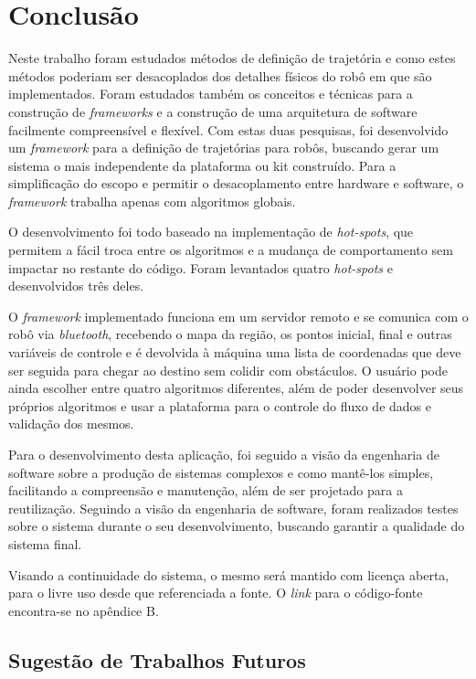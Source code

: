 \chapter[Conclusão]{Conclusão}

Neste trabalho foram estudados métodos de definição de trajetória e como estes métodos poderiam ser desacoplados dos detalhes físicos do robô em que são implementados. Foram estudados também os conceitos e técnicas para a construção de \textit{frameworks} e a construção de uma arquitetura de software facilmente compreensível e flexível. Com estas duas pesquisas, foi desenvolvido um \textit{framework} para a definição de trajetórias para robôs, buscando gerar um sistema o mais independente da plataforma ou kit construído. Para a simplificação do escopo e permitir o desacoplamento entre hardware e software, o \textit{framework} trabalha apenas com algoritmos globais.

O desenvolvimento foi todo baseado na implementação de \textit{hot-spots}, que permitem a fácil troca entre os algoritmos e a mudança de comportamento sem impactar no restante do código. Foram levantados quatro \textit{hot-spots} e desenvolvidos três deles.

O \textit{framework} implementado funciona em um servidor remoto e se comunica com o robô via \textit{bluetooth}, recebendo o mapa da região, os pontos inicial, final e outras variáveis de controle e é devolvida à máquina uma lista de coordenadas que deve ser seguida para chegar ao destino sem colidir com obstáculos. O usuário pode ainda escolher entre quatro algoritmos diferentes, além de poder desenvolver seus próprios algoritmos e usar a plataforma para o controle do fluxo de dados e validação dos mesmos.

Para o desenvolvimento desta aplicação, foi seguido a visão da engenharia de software sobre a produção de sistemas complexos e como mantê-los simples, facilitando a compreensão e manutenção, além de ser projetado para a reutilização. Seguindo a visão da engenharia de software, foram realizados testes sobre o sistema durante o seu desenvolvimento, buscando garantir a qualidade do sistema final.

Visando a continuidade do sistema, o mesmo será mantido com licença aberta, para o livre uso desde que referenciada a fonte. O \textit{link} para o código-fonte encontra-se no apêndice B.

\section{Sugestão de Trabalhos Futuros}

